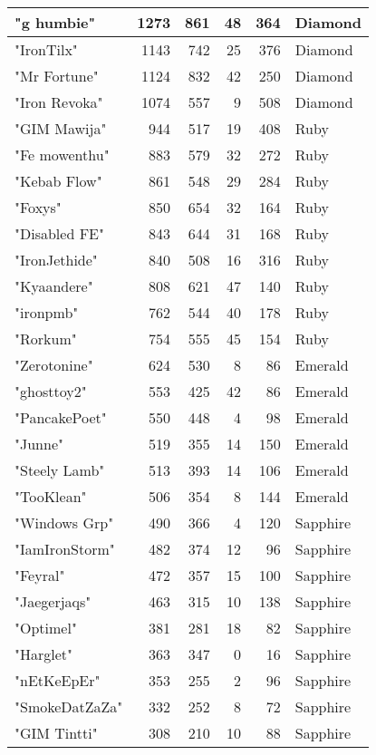 \documentclass{article}
\begin{document}
\begin{table}[htbp]
\begin{tabular}{|l|r|r|r|r|l|}
"g humbie" & 1273 & 861 & 48 & 364 & Diamond \\ \hline
"IronTilx" & 1143 & 742 & 25 & 376 & Diamond \\ \hline
"Mr Fortune" & 1124 & 832 & 42 & 250 & Diamond \\ \hline
"Iron Revoka" & 1074 & 557 & 9 & 508 & Diamond \\ \hline
"GIM Mawija" & 944 & 517 & 19 & 408 & Ruby \\ \hline
"Fe mowenthu" & 883 & 579 & 32 & 272 & Ruby \\ \hline
"Kebab Flow" & 861 & 548 & 29 & 284 & Ruby \\ \hline
"Foxys" & 850 & 654 & 32 & 164 & Ruby \\ \hline
"Disabled FE" & 843 & 644 & 31 & 168 & Ruby \\ \hline
"IronJethide" & 840 & 508 & 16 & 316 & Ruby \\ \hline
"Kyaandere" & 808 & 621 & 47 & 140 & Ruby \\ \hline
"ironpmb" & 762 & 544 & 40 & 178 & Ruby \\ \hline
"Rorkum" & 754 & 555 & 45 & 154 & Ruby \\ \hline
"Zerotonine" & 624 & 530 & 8 & 86 & Emerald \\ \hline
"ghosttoy2" & 553 & 425 & 42 & 86 & Emerald \\ \hline
"PancakePoet" & 550 & 448 & 4 & 98 & Emerald \\ \hline
"Junne" & 519 & 355 & 14 & 150 & Emerald \\ \hline
"Steely Lamb" & 513 & 393 & 14 & 106 & Emerald \\ \hline
"TooKlean" & 506 & 354 & 8 & 144 & Emerald \\ \hline
"Windows Grp" & 490 & 366 & 4 & 120 & Sapphire \\ \hline
"IamIronStorm" & 482 & 374 & 12 & 96 & Sapphire \\ \hline
"Feyral" & 472 & 357 & 15 & 100 & Sapphire \\ \hline
"Jaegerjaqs" & 463 & 315 & 10 & 138 & Sapphire \\ \hline
"Optimel" & 381 & 281 & 18 & 82 & Sapphire \\ \hline
"Harglet" & 363 & 347 & 0 & 16 & Sapphire \\ \hline
"nEtKeEpEr" & 353 & 255 & 2 & 96 & Sapphire \\ \hline
"SmokeDatZaZa" & 332 & 252 & 8 & 72 & Sapphire \\ \hline
"GIM Tintti" & 308 & 210 & 10 & 88 & Sapphire \\ \hline

\end{tabular}
\end{table}
\end{document}
